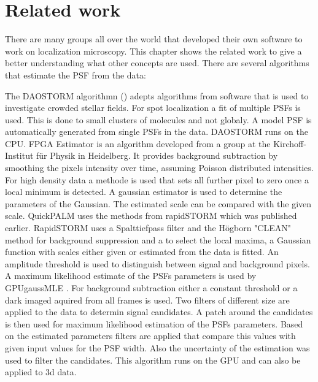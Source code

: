 \chapter{Related work}
There are many groups all over the world that developed their own software to work on localization microscopy. This chapter shows the related work to give a better understanding what other concepts are used.\newline
There are several algorithms that estimate the PSF from the data:\newline

The DAOSTORM algorithmn (\cite{DAO}) adepts algorithms from software that is used to investigate crowded stellar fields. For spot localization a fit of multiple PSFs is used. This is done to small clusters of molecules and not globaly. A model PSF is automatically generated from single PSFs in the data. DAOSTORM runs on the CPU.\newline
FPGA Estimator \cite{simulated} is an algorithm developed from a group at the Kirchoff-Institut f\"ur Physik in Heidelberg. It provides background subtraction by smoothing the pixels intensity over time, assuming Poisson distributed intensities. For high density data a methode is used that sets all further pixel to zero once a local minimum is detected. A gaussian estimator is used to determine the parameters of the Gaussian. The estimated scale can be compared with the given scale.\newline
QuickPALM \cite{quickpalm} uses the methods from rapidSTORM \cite{rapidstorm} which was published earlier. RapidSTORM uses a Spalttiefpass filter and the H\"ogborn "CLEAN" method for background suppression and a to select the local maxima, a Gaussian function with scales either given or estimated from the data is fitted. An amplitude threshold is used to distinguish between signal and background pixels. 
A maximum likelihood estimate of the PSFs parameters is used by GPUgaussMLE \cite{alg3}. For background subtraction either a constant threshold or a dark imaged aquired from all frames is used. Two filters of different size are applied to the data to determin signal candidates. A patch around the candidates is then used for maximum likelihood estimation of the PSFs parameters. Based on the estimated parameters filters are applied that compare this values with given input values for the PSF width. Also the uncertainty of the estimation was used to filter the candidates. This algorithm runs on the GPU and can also be applied to 3d data.\newline

